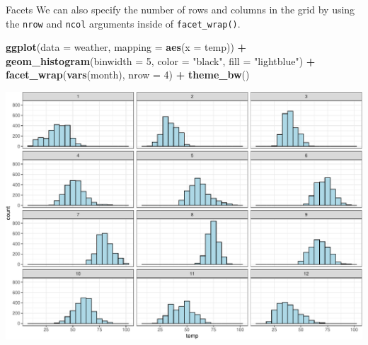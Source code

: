 \documentclass[
  ignorenonframetext,
]{beamer}
\newenvironment{Shaded}{\begin{snugshade}}{\end{snugshade}}
\newcommand{\AttributeTok}[1]{\textcolor[rgb]{0.13,0.29,0.53}{#1}}
\newcommand{\DecValTok}[1]{\textcolor[rgb]{0.00,0.00,0.81}{#1}}
\newcommand{\FunctionTok}[1]{\textcolor[rgb]{0.13,0.29,0.53}{\textbf{#1}}}
\newcommand{\NormalTok}[1]{#1}
\newcommand{\SpecialCharTok}[1]{\textcolor[rgb]{0.81,0.36,0.00}{\textbf{#1}}}
\newcommand{\StringTok}[1]{\textcolor[rgb]{0.31,0.60,0.02}{#1}}
\begin{document}
\begin{frame}[fragile]{Facets}
\protect\hypertarget{facets-2}{}
We can also specify the number of rows and columns in the grid by using
the \texttt{nrow} and \texttt{ncol} arguments inside of
\texttt{facet\_wrap()}.

\tiny

\begin{Shaded}
\begin{Highlighting}[]
\FunctionTok{ggplot}\NormalTok{(}\AttributeTok{data =}\NormalTok{ weather, }\AttributeTok{mapping =} \FunctionTok{aes}\NormalTok{(}\AttributeTok{x =}\NormalTok{ temp)) }\SpecialCharTok{+}
  \FunctionTok{geom\_histogram}\NormalTok{(}\AttributeTok{binwidth =} \DecValTok{5}\NormalTok{, }\AttributeTok{color =} \StringTok{"black"}\NormalTok{, }\AttributeTok{fill =} \StringTok{"lightblue"}\NormalTok{) }\SpecialCharTok{+}
  \FunctionTok{facet\_wrap}\NormalTok{(}\FunctionTok{vars}\NormalTok{(month), }\AttributeTok{nrow =} \DecValTok{4}\NormalTok{) }\SpecialCharTok{+}
  \FunctionTok{theme\_bw}\NormalTok{()}
\end{Highlighting}
\end{Shaded}

\begin{center}\includegraphics[width=0.7\linewidth,height=0.6\textheight]{Week2_Lect_files/figure-beamer/unnamed-chunk-31-1} \end{center}
\normalsize
\end{frame}
\end{document}
